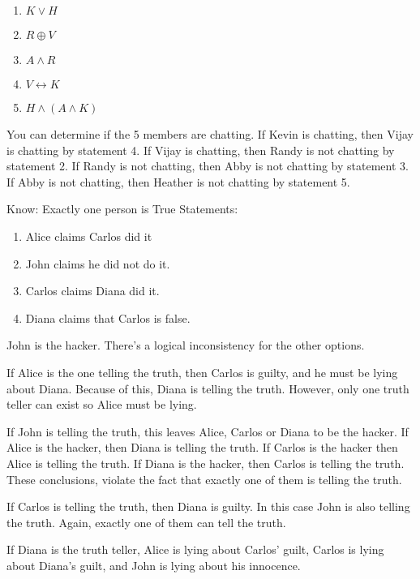 \documentclass[12pt]{article}  %
\newcommand{\AND}{\wedge}
\newcommand{\OR}{\vee}
\newcommand{\XOR}{\oplus}
\newcommand{\IFF}{\leftrightarrow}
\begin{document}
\begin{enumerate}
    \item $\displaystyle K\OR H$
    \item $\displaystyle R \XOR V$
    \item $\displaystyle A \AND R$
    \item $\displaystyle V \IFF K$
    \item $\displaystyle H \AND (A \AND K)$
\end{enumerate}
You can determine if the 5 members are chatting.
\newline
If Kevin is chatting, then Vijay is chatting by statement 4.
If Vijay is chatting, then Randy is not chatting by statement 2.
If Randy is not chatting, then Abby is not chatting by statement 3.
If Abby is not chatting, then Heather is not chatting by statement 5.

\clearpage
{}
\newline
Know: Exactly one person is True
\newline
Statements:
\begin{enumerate}
    \item Alice claims Carlos did it
    \item John claims he did not do it.
    \item Carlos claims Diana did it.
    \item Diana claims that Carlos is false.
\end{enumerate}
John is the hacker.\newline
There's a logical inconsistency for the other options.

If Alice is the one telling the truth, then Carlos is guilty, and he must be lying about Diana. Because of this, Diana is telling the truth. However, only one truth teller can exist so Alice must be lying.

If John is telling the truth, this leaves Alice, Carlos or Diana to be the hacker. If Alice is the hacker, then Diana is telling the truth. If Carlos is the hacker then Alice is telling the truth. If Diana is the hacker, then Carlos is telling the truth. These conclusions, violate the fact that exactly one of them is telling the truth.

If Carlos is telling the truth, then Diana is guilty. In this case John is also telling the truth. Again, exactly one of them can tell the truth.

If Diana is the truth teller, Alice is lying about Carlos' guilt, Carlos is lying about Diana's guilt, and John is lying about his innocence.
\end{document}
